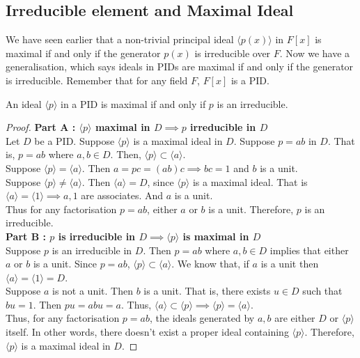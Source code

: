 \subsection{Irreducible element and Maximal Ideal}
We have seen earlier that a non-trivial principal ideal $\langle p(x) \rangle$ in $F[x]$ is maximal if and only if the generator $p(x)$ is irreducible over $F$.
Now we have a generalisation, which says ideals in PIDs are maximal if and only if the generator is irreducible.
Remember that for any field $F$, $F[x]$ is a PID.
\begin{lemma}
	An ideal $\langle p \rangle$ in a PID is maximal if and only if $p$ is an irreducible.
\end{lemma}
\begin{proof}
	\textbf{Part A : $\langle p \rangle$ maximal in $D \implies p$ irreducible in $D$}\\
	Let $D$ be a PID.
	Suppose $\langle p \rangle$ is a maximal ideal in $D$.
	Suppose $p = ab$ in $D$.
	That is, $p = ab$ where $a,b \in D$.
	Then, $\langle p \rangle \subset \langle a \rangle$.\\

	Suppose $\langle p \rangle = \langle a \rangle$.
	Then $a = pc = (ab)c \implies bc = 1$ and $b$ is a unit.\\

	Suppose $\langle p \rangle \ne \langle a \rangle$.
	Then $\langle a \rangle = D$, since $\langle p \rangle$ is a maximal ideal.
	That is $\langle a \rangle = \langle 1 \rangle \implies a,1$ are associates.
	And $a$ is a unit.\\

	Thus for any factorisation $p = ab$, either $a$ or $b$ is a unit.
	Therefore, $p$ is an irreducible.\\

	\textbf{Part B : $p$ is irreducible in $D \implies \langle p \rangle$ is maximal in $D$}\\
	Suppose $p$ is an irreducible in $D$.
	Then $p = ab$ where $a,b \in D $ implies that either $a$ or $b$ is a unit.
	Since $p = ab$, $\langle p \rangle \subset \langle a \rangle$.
	We know that, if $a$ is a unit then $\langle a \rangle = \langle 1 \rangle = D$.\\

	Suppose $a$ is not a unit.
	Then $b$ is a unit.
	That is, there exists $u \in D$ such that $bu = 1$.
	Then $pu = abu= a$.
	Thus, $\langle a \rangle \subset \langle p \rangle \implies \langle p \rangle = \langle a \rangle$.\\

	Thus, for any factorisation $p = ab$, the ideals generated by $a,b$ are either $D$ or $\langle p \rangle$ itself.
	In other words, there doesn't exist a proper ideal containing $\langle p \rangle$.
	Therefore, $\langle p \rangle$ is a maximal ideal in $D$.
\end{proof}

